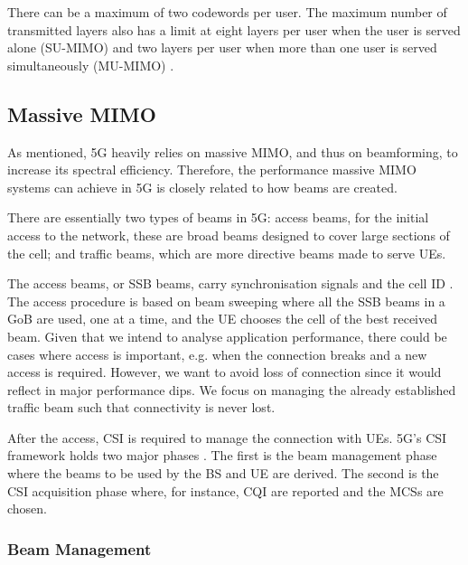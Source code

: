 

There can be a maximum of two codewords per user. The maximum number of transmitted layers also has a limit at eight layers per user when the user is served alone (SU-MIMO) and two layers per user when more than one user is served simultaneously (MU-MIMO) \cite{3gpp-codebooks}.



\subsection*{Massive MIMO}

As mentioned, 5G heavily relies on massive MIMO, and thus on beamforming, to increase its spectral efficiency. Therefore, the performance massive MIMO systems can achieve in 5G is closely related to how beams are created.

There are essentially two types of beams in 5G: access beams, for the initial access to the network, these are broad beams designed to cover large sections of the cell; and traffic beams, which are more directive beams made to serve \acsp{UE}.

The access beams, or \ac{SSB} beams, carry synchronisation signals and the cell \acs{ID} \cite{8407094}. The access procedure is based on beam sweeping where all the SSB beams in a \ac{GoB} are used, one at a time, and the UE chooses the cell of the best received beam. Given that we intend to analyse application performance, there could be cases where access is important, e.g. when the connection breaks and a new access is required. However, we want to avoid loss of connection since it would reflect in major performance dips. We focus on managing the already established traffic beam such that connectivity is never lost.

After the access, \ac{CSI} is required to manage the connection with UEs. 5G's \ac{CSI} framework holds two major phases \cite{beam_management}. The first is the beam management phase where the beams to be used by the \ac{BS} and \ac{UE} are derived. The second is the CSI acquisition phase where, for instance, \acs{CQI} are reported and the \acsp{MCS} are chosen. 

\subsubsection*{Beam Management}

